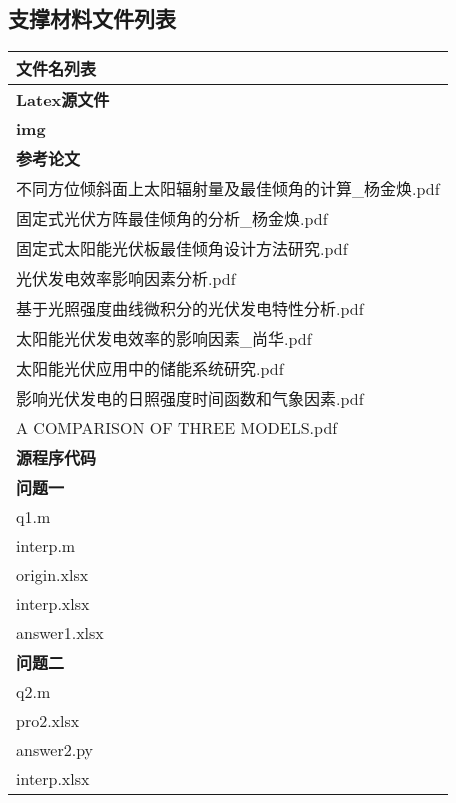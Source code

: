 \documentclass[withoutpreface,bwprint]{cumcmthesis} %
\begin{document}
\begin{appendices}

\section{支撑材料文件列表}

\begin{table}[!htbp]
	\label{tab:001} \centering
	\setlength{\tabcolsep}{25mm}
	\begin{tabular*}{\hsize}{@{}@{\extracolsep{\fill}}l@{}}
		\toprule[1.5pt]
		\qquad 文件名列表 \\
		\midrule[1pt]
		\qquad \textbf{Latex源文件} \\
		\qquad \textbf{img} \\
		\qquad \textbf{参考论文} \\
		\qquad \qquad  不同方位倾斜面上太阳辐射量及最佳倾角的计算\_杨金焕.pdf\\
		\qquad \qquad  固定式光伏方阵最佳倾角的分析\_杨金焕.pdf\\
		\qquad \qquad  固定式太阳能光伏板最佳倾角设计方法研究.pdf\\
		\qquad \qquad  光伏发电效率影响因素分析.pdf\\
		\qquad \qquad  基于光照强度曲线微积分的光伏发电特性分析.pdf\\
		\qquad \qquad  太阳能光伏发电效率的影响因素\_尚华.pdf\\
		\qquad \qquad  太阳能光伏应用中的储能系统研究.pdf\\
		\qquad \qquad  影响光伏发电的日照强度时间函数和气象因素.pdf\\
		\qquad \qquad  A COMPARISON OF THREE MODELS.pdf\\
		\qquad \textbf{源程序代码}\\
		\qquad \qquad \textbf{问题一} \\
		\qquad \qquad \qquad q1.m \\
		\qquad \qquad \qquad interp.m \\
		\qquad \qquad \qquad origin.xlsx \\
		\qquad \qquad \qquad interp.xlsx \\
		\qquad \qquad \qquad answer1.xlsx \\
		\qquad \qquad \textbf{问题二} \\
		\qquad \qquad \qquad q2.m \\
		\qquad \qquad \qquad pro2.xlsx \\
		\qquad \qquad \qquad answer2.py \\
		\qquad \qquad \qquad interp.xlsx \\

\end{tabular*}
\end{table}
\end{appendices}
\end{document}
